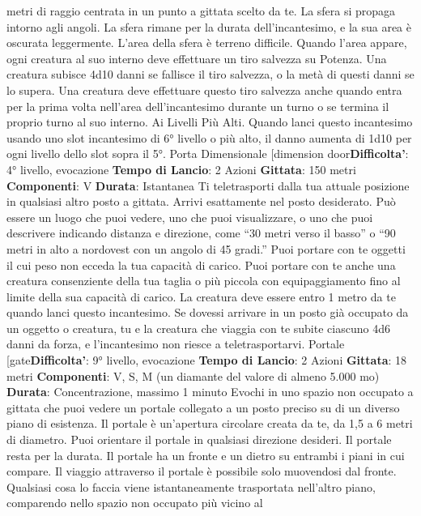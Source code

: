 \begin{multicols}{2}
metri di raggio centrata in un punto a gittata scelto da
te. La sfera si propaga intorno agli angoli. La sfera
rimane per la durata dell’incantesimo, e la sua area è
oscurata leggermente. L’area della sfera è terreno
difficile.
Quando l’area appare, ogni creatura al suo interno deve
effettuare un tiro salvezza su Potenza. Una
creatura subisce 4d10 danni se fallisce il tiro
salvezza, o la metà di questi danni se lo supera. Una
creatura deve effettuare questo tiro salvezza anche
quando entra per la prima volta nell’area
dell’incantesimo durante un turno o se termina il proprio
turno al suo interno.
Ai Livelli Più Alti. Quando lanci questo incantesimo
usando uno slot incantesimo di 6° livello o più alto, il
danno aumenta di 1d10 per ogni livello dello slot sopra
il 5°.
Porta Dimensionale
[dimension door\textbf{Difficolta'}:
4° livello, evocazione
\textbf{Tempo di Lancio}: 2 Azioni
\textbf{Gittata}: 150 metri
\textbf{Componenti}: V
\textbf{Durata}: Istantanea
Ti teletrasporti dalla tua attuale posizione in qualsiasi
altro posto a gittata. Arrivi esattamente nel posto
desiderato. Può essere un luogo che puoi vedere, uno
che puoi visualizzare, o uno che puoi descrivere
indicando distanza e direzione, come “30 metri verso il
basso” o “90 metri in alto a nordovest con un angolo di
45 gradi.”
Puoi portare con te oggetti il cui peso non ecceda la tua
capacità di carico. Puoi portare con te anche una
creatura consenziente della tua taglia o più piccola con
equipaggiamento fino al limite della sua capacità di
carico. La creatura deve essere entro 1 metro da te
quando lanci questo incantesimo.
Se dovessi arrivare in un posto già occupato da un
oggetto o creatura, tu e la creatura che viaggia con te
subite ciascuno 4d6 danni da forza, e l’incantesimo non
riesce a teletrasportarvi.
Portale
[gate\textbf{Difficolta'}:
9° livello, evocazione
\textbf{Tempo di Lancio}: 2 Azioni
\textbf{Gittata}: 18 metri
\textbf{Componenti}: V, S, M (un diamante del valore di
almeno 5.000 mo)
\textbf{Durata}: Concentrazione, massimo 1 minuto
Evochi in uno spazio non occupato a gittata che puoi
vedere un portale collegato a un posto preciso su di un
diverso piano di esistenza. Il portale è un’apertura
circolare creata da te, da 1,5 a 6 metri di diametro. Puoi
orientare il portale in qualsiasi direzione desideri. Il
portale resta per la durata.
Il portale ha un fronte e un dietro su entrambi i piani in
cui compare. Il viaggio attraverso il portale è possibile
solo muovendosi dal fronte. Qualsiasi cosa lo faccia
viene istantaneamente trasportata nell’altro piano,
comparendo nello spazio non occupato più vicino al

\end{multicols}
